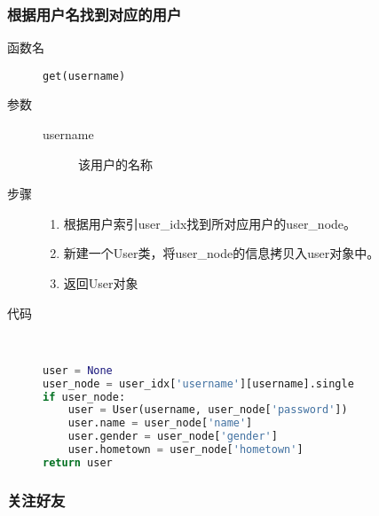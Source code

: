\documentclass{yaldc}
\begin{document}
\subsubsection{根据用户名找到对应的用户}

\begin{description}
    \item[函数名] \verb|get(username)|
    \item[参数]
        \begin{description}
            \item[username] 该用户的名称
        \end{description}
    \item[步骤]
        \begin{enumerate}
            \item 根据用户索引user\_idx找到所对应用户的user\_node。
            \item 新建一个User类，将user\_node的信息拷贝入user对象中。
            \item 返回User对象
        \end{enumerate}
    \item[代码] ~
        \begin{lstlisting}[language=Python]
user = None
user_node = user_idx['username'][username].single
if user_node:
    user = User(username, user_node['password'])
    user.name = user_node['name']
    user.gender = user_node['gender']
    user.hometown = user_node['hometown']
return user
        \end{lstlisting}
\end{description}

\subsubsection{关注好友}
\end{document}
